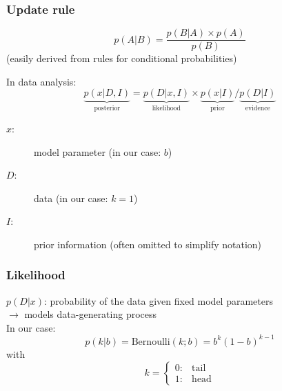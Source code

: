 \documentclass[t,aspectratio=169]{beamer}
\begin{document}
\begin{frame}
  \frametitle{Update rule}
  \begin{tcolorbox}[title=Bayes' theorem]
    \begin{equation*}
      p(A|B) = \frac{p(B|A) \times p(A)}{p(B)}
    \end{equation*}
    (easily derived from rules for conditional probabilities)
  \end{tcolorbox}
  In data analysis:
  \begin{equation*}
    \underbrace{p(x|D,I)}_{\mathrm{posterior}} = \underbrace{p(D|x,I)}_{\mathrm{likelihood}} \times \underbrace{p(x|I)}_{\mathrm{prior}} / \underbrace{p(D|I)}_{\mathrm{evidence}}
  \end{equation*}
  \begin{description}
  \item[$x$:] model parameter (in our case: $b$)
  \item[$D$:] data (in our case: $k=1$)
  \item[$I$:] prior information (often omitted to simplify notation)
  \end{description}
\end{frame}


\begin{frame}
  \frametitle{Likelihood}
  $p(D|x)$: probability of the data given fixed model parameters\\
  $\rightarrow$ models data-generating process\\
  \bigbreak
  In our case:
  \begin{equation*}
    p(k|b) = \mathrm{Bernoulli}(k;b) = b^k(1-b)^{k-1} 
  \end{equation*}
  with
  \begin{equation*}
    k = \begin{cases} 0:& \mathrm{tail}\\
      1:& \mathrm{head}
    \end{cases}
  \end{equation*}
  \vfill
  \centering
\end{frame}
\end{document}
